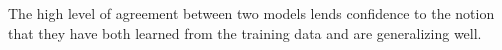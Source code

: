 \documentclass[10pt,letterpaper]{article}
\begin{document}
The high level of agreement between two models lends confidence to the notion that they have both learned from the training data and are generalizing well. 


\end{document}
